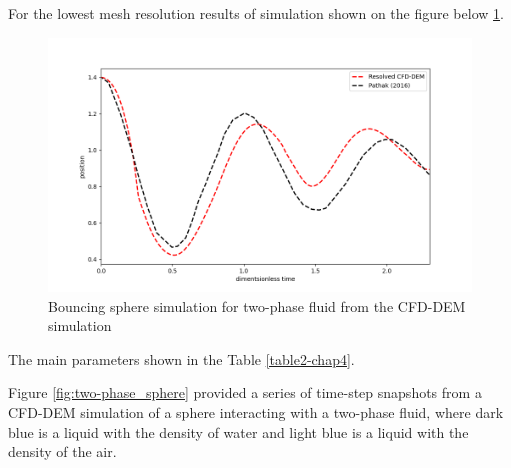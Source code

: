 For the lowest mesh resolution results of simulation shown on the figure below \ref{fig:2ph_exp}.
\begin{figure}[!ht]
    \centering
    \includegraphics[width=15cm]{Images/chap3/bouncing_sphere_plot.png}
    \caption{Bouncing sphere simulation for two-phase fluid from the CFD-DEM simulation}
    \label{fig:2ph_exp}
    \end{figure}
The main parameters shown in the Table \ref{table2-chap4}. 

Figure \ref{fig:two-phase_sphere} provided a series of time-step snapshots from a CFD-DEM simulation of a sphere interacting with a two-phase fluid, where dark blue is a liquid with the density of water and light blue is a liquid with the density of the air.

